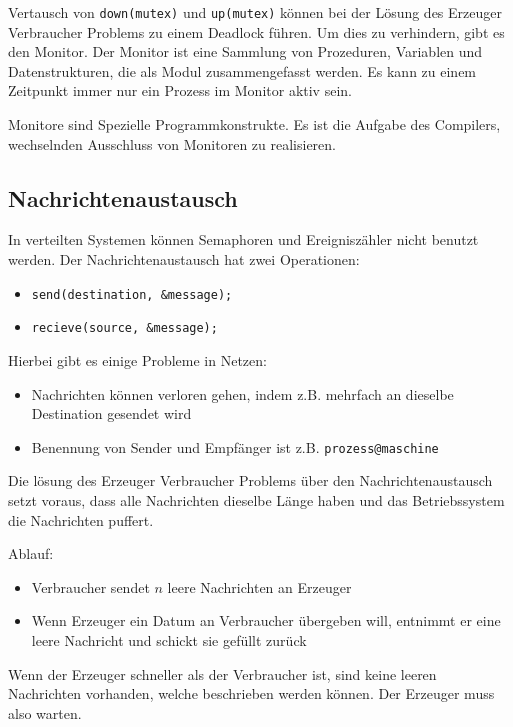 Vertausch von \texttt{down(mutex)} und \texttt{up(mutex)} können bei der Lösung des Erzeuger Verbraucher Problems zu einem Deadlock führen. Um dies zu verhindern, gibt es den Monitor. Der Monitor ist eine Sammlung von Prozeduren, Variablen und Datenstrukturen, die als Modul zusammengefasst werden. Es kann zu einem Zeitpunkt immer nur ein Prozess im Monitor aktiv sein.

Monitore sind Spezielle Programmkonstrukte. Es ist die Aufgabe des Compilers, wechselnden Ausschluss von Monitoren zu realisieren.

\subsection{Nachrichtenaustausch}

In verteilten Systemen können Semaphoren und Ereigniszähler nicht benutzt werden. Der Nachrichtenaustausch hat zwei Operationen:

\begin{itemize}
    \item \texttt{send(destination, \&message);}
    \item \texttt{recieve(source, \&message);}
\end{itemize}

Hierbei gibt es einige Probleme in Netzen:

\begin{itemize}
    \item Nachrichten können verloren gehen, indem z.B. mehrfach an dieselbe Destination gesendet wird
    \item Benennung von Sender und Empfänger ist z.B. \texttt{prozess@maschine}
\end{itemize}

Die lösung des Erzeuger Verbraucher Problems über den Nachrichtenaustausch setzt voraus, dass alle Nachrichten dieselbe Länge haben und das Betriebssystem die Nachrichten puffert.

Ablauf:

\begin{itemize}
    \item Verbraucher sendet $n$ leere Nachrichten an Erzeuger
    \item Wenn Erzeuger ein Datum an Verbraucher übergeben will, entnimmt er eine leere Nachricht und schickt sie gefüllt zurück
\end{itemize}

Wenn der Erzeuger schneller als der Verbraucher ist, sind keine leeren Nach\-rich\-ten vorhanden, welche beschrieben werden können. Der Erzeuger muss also warten.

